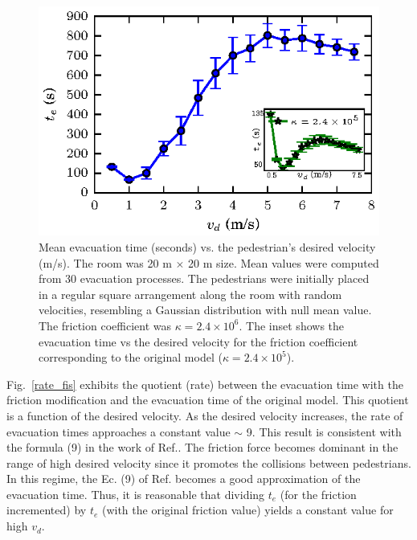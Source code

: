 \begin{figure}[htbp!]
\includegraphics[width=\columnwidth]
{./plots/fis_kx10.eps}
\caption{\label{fis} Mean evacuation time (seconds) vs. the pedestrian’s desired velocity (m/s). The room was 20 m $\times$ 20 m size. Mean values were computed from 30 evacuation processes. The pedestrians were initially placed in a regular square arrangement along the room with random velocities, resembling a Gaussian distribution with null mean value. The friction coefficient was $\kappa=2.4\times10^{6}$. The inset shows the evacuation time vs the desired velocity for the friction coefficient corresponding to the original model ($\kappa=2.4\times10^{5}$).  }
\end{figure}

Fig.~\ref{rate_fis} exhibits the quotient (rate) between the evacuation time with the friction modification and the evacuation time of the original model. This quotient is a function of the desired velocity. As the desired velocity increases, the rate of evacuation times approaches a constant value $\sim$ 9. This result is consistent with the formula (9) in the work of Ref.\cite{sticco}. The friction force becomes dominant in the range of high desired velocity since it promotes the collisions between pedestrians. In this regime, the Ec. (9) of  Ref.\cite{sticco} becomes a good approximation of the evacuation time. Thus, it is reasonable that dividing $t_e$ (for the friction incremented) by $t_e$ (with the original friction value) yields a constant value for high $v_d$.  

